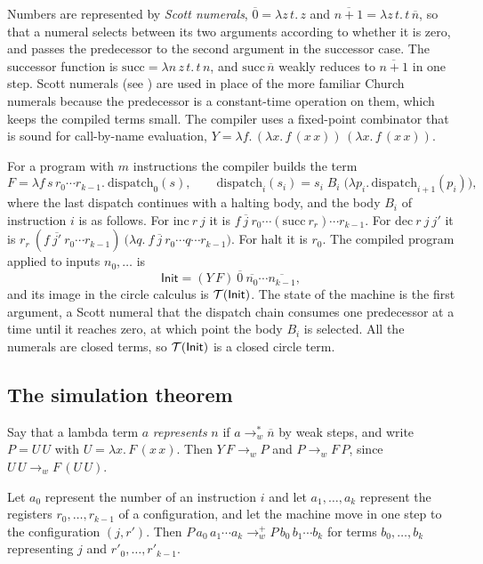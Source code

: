Numbers are represented by \emph{Scott numerals}, $\overline{0}=\lambda z\,t.\,z$ and $\overline{n+1}=\lambda z\,t.\,t\,\overline{n}$, so that a numeral selects between its two arguments according to whether it is zero, and passes the predecessor to the second argument in the successor case. The successor function is $\mathrm{succ}=\lambda n\,z\,t.\,t\,n$, and $\mathrm{succ}\,\overline{n}$ weakly reduces to $\overline{n+1}$ in one step. Scott numerals (see \cite{mogensen}) are used in place of the more familiar Church numerals because the predecessor is a constant-time operation on them, which keeps the compiled terms small. The compiler uses a fixed-point combinator that is sound for call-by-name evaluation, $Y=\lambda f.\,(\lambda x.\,f\,(x\,x))\,(\lambda x.\,f\,(x\,x))$.

For a program with $m$ instructions the compiler builds the term
\[
F=\lambda f\,s\,r_0\cdots r_{k-1}.\ \mathrm{dispatch}_0(s),
\qquad
\mathrm{dispatch}_i(s_i)=s_i\;B_i\;\bigl(\lambda p_i.\,\mathrm{dispatch}_{i+1}(p_i)\bigr),
\]
where the last dispatch continues with a halting body, and the body $B_i$ of instruction $i$ is as follows. For $\mathrm{inc}\ r\ j$ it is $f\ \overline{j}\ r_0\cdots(\mathrm{succ}\ r_r)\cdots r_{k-1}$. For $\mathrm{dec}\ r\ j\ j'$ it is $r_r\ (f\ \overline{j'}\ r_0\cdots r_{k-1})\ \bigl(\lambda q.\ f\ \overline{j}\ r_0\cdots q\cdots r_{k-1}\bigr)$. For $\mathrm{halt}$ it is $r_0$. The compiled program applied to inputs $n_0,\dots$ is
\[
\mathsf{Init}=(Y\,F)\ \overline{0}\ \overline{n_0}\cdots\overline{n_{k-1}},
\]
and its image in the circle calculus is $\mathcal{T}(\mathsf{Init})$. The state of the machine is the first argument, a Scott numeral that the dispatch chain consumes one predecessor at a time until it reaches zero, at which point the body $B_i$ is selected. All the numerals are closed terms, so $\mathcal{T}(\mathsf{Init})$ is a closed circle term.

\subsection{The simulation theorem}

Say that a lambda term $a$ \emph{represents} $n$ if $a\to_w^*\overline{n}$ by weak steps, and write $P=U\,U$ with $U=\lambda x.\,F\,(x\,x)$. Then $Y\,F\to_w P$ and $P\to_w F\,P$, since $U\,U\to_w F\,(U\,U)$.

\begin{lemma}\label{lem:onestep}
Let $a_0$ represent the number of an instruction $i$ and let $a_1,\dots,a_k$ represent the registers $r_0,\dots,r_{k-1}$ of a configuration, and let the machine move in one step to the configuration $(j,r')$. Then $P\,a_0\,a_1\cdots a_k\to_w^+P\,b_0\,b_1\cdots b_k$ for terms $b_0,\dots,b_k$ representing $j$ and $r'_0,\dots,r'_{k-1}$.
\end{lemma}


